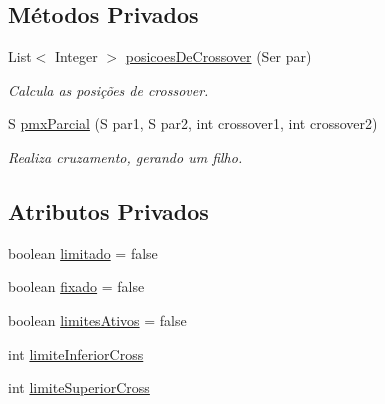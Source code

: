 \subsection*{Métodos Privados}
\begin{DoxyCompactItemize}
\item 
List$<$ Integer $>$ \hyperlink{classic_1_1populacional_1_1algoritmo_1_1operadores_1_1recombinador_1_1_p_m_x_3_01_s_01extends_01_ser_01_4_ae728332ad4003249c953ea7e40fbc5f3}{posicoes\-De\-Crossover} (Ser par)
\begin{DoxyCompactList}\small\item\em Calcula as posições de crossover. \end{DoxyCompactList}\item 
S \hyperlink{classic_1_1populacional_1_1algoritmo_1_1operadores_1_1recombinador_1_1_p_m_x_3_01_s_01extends_01_ser_01_4_afd1da8537104869eca9569500487c041}{pmx\-Parcial} (S par1, S par2, int crossover1, int crossover2)
\begin{DoxyCompactList}\small\item\em Realiza cruzamento, gerando um filho. \end{DoxyCompactList}\end{DoxyCompactItemize}
\subsection*{Atributos Privados}
\begin{DoxyCompactItemize}
\item 
boolean \hyperlink{classic_1_1populacional_1_1algoritmo_1_1operadores_1_1recombinador_1_1_p_m_x_3_01_s_01extends_01_ser_01_4_abb460a5b5ce5c65297867a7284418498}{limitado} = false
\item 
boolean \hyperlink{classic_1_1populacional_1_1algoritmo_1_1operadores_1_1recombinador_1_1_p_m_x_3_01_s_01extends_01_ser_01_4_affd416ddea8d26b202849366ea345d2d}{fixado} = false
\item 
boolean \hyperlink{classic_1_1populacional_1_1algoritmo_1_1operadores_1_1recombinador_1_1_p_m_x_3_01_s_01extends_01_ser_01_4_a92c5e45dcd2dc819f0184277d563e018}{limites\-Ativos} = false
\item 
int \hyperlink{classic_1_1populacional_1_1algoritmo_1_1operadores_1_1recombinador_1_1_p_m_x_3_01_s_01extends_01_ser_01_4_afa30d091104d7e520e3d1612a8453ee0}{limite\-Inferior\-Cross}
\item 
int \hyperlink{classic_1_1populacional_1_1algoritmo_1_1operadores_1_1recombinador_1_1_p_m_x_3_01_s_01extends_01_ser_01_4_ab3e6575836e6b19fa425076b30e90d70}{limite\-Superior\-Cross}
\end{DoxyCompactItemize}


